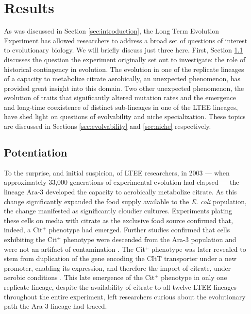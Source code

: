 \section{Results} \label{sec:results}

As was discussed in Section \ref{sec:introduction}, the Long Term Evolution Experiment has allowed researchers to address a broad set of questions of interest to evolutionary biology.
We will briefly discuss just three here.
First, Section \ref{sec:potentiation} discusses the question the experiment originally set out to investigate: the role of historical contingency in evolution.
The evolution in one of the replicate lineages of a capacity to metabolize citrate aerobically, an unexpected phenomenon, has provided great insight into this domain. 
Two other unexpected phenomenon, the evolution of traits that significantly altered mutation rates and the emergence and long-time coexistence of distinct sub-lineages in one of the LTEE lineages, have shed light on questions of evolvability and niche specialization. 
These topics are discussed in Sections \ref{sec:evolvability} and \ref{sec:niche} respectively.

\subsection{Potentiation} \label{sec:potentiation}

To the surprise, and initial suspicion, of LTEE researchers, in 2003 --- when approximately 33,000 generations of experimental evolution had elapsed --- the lineage Ara-3 developed the capacity to aerobically metabolize citrate.
As this change significantly expanded the food supply available to the \textit{E. coli} population, the change manifested as significantly cloudier cultures.
Experiments plating these cells on media with citrate as the exclusive food source confirmed that, indeed, a Cit$^+$ phenotype had emerged.
Further studies confirmed that cells exhibiting the Cit$^+$ phenotype were descended from the Ara-3 population and were not an artifact of contamination \cite{Blount2008HistoricalColi.}.
The Cit$^+$ phenotype was later revealed to stem from duplication of the gene encoding the CItT transporter under a new promoter, enabling its expression, and therefore the import of citrate, under aerobic conditions \cite{Blount2012GenomicPopulation}.
This late emergence of the Cit$^+$ phenotype in only one replicate lineage, despite the availability of citrate to all twelve LTEE lineages throughout the entire experiment, left researchers curious about the evolutionary path the Ara-3 lineage had traced.

